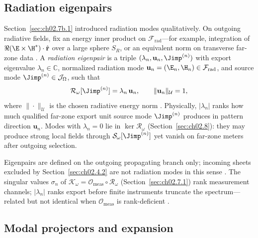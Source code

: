 
\subsection{Radiation eigenpairs}
\label{sec:ch02.7b.6}

Section~\ref{sec:ch02.7b.1} introduced radiation modes qualitatively. On outgoing radiative fields, fix an energy inner product on $\mathcal{F}_{\mathrm{rad}}$---for example, integration of $\Re(\E\times\H^*)\cdot\hat{\mathbf{r}}$ over a large sphere $S_R$, or an equivalent norm on transverse far-zone data \cite{stratton1941,harrington2001}. A \emph{radiation eigenpair} is a triple $(\lambda_n,\mathbf{u}_n,\Jimp^{(n)})$ with export eigenvalue $\lambda_n\in\mathbb{C}$, normalized radiation mode $\mathbf{u}_n=(\E_n,\H_n)\in\mathcal{F}_{\mathrm{rad}}$, and source mode $\Jimp^{(n)}\in\mathcal{J}_\Omega$, such that
\begin{equation}
\label{eq:ch2.radiation-eigenpair-def}
\mathcal{R}_\omega[\Jimp^{(n)}]=\lambda_n\,\mathbf{u}_n,
\qquad
\|\mathbf{u}_n\|_{\mathcal{U}}=1,
\end{equation}
where $\|\cdot\|_{\mathcal{U}}$ is the chosen radiative energy norm \cite{stratton1941}. Physically, $|\lambda_n|$ ranks how much qualified far-zone export unit source mode $\Jimp^{(n)}$ produces in pattern direction $\mathbf{u}_n$. Modes with $\lambda_n=0$ lie in $\ker\mathcal{R}_\omega$ (Section~\ref{sec:ch02.8}): they may produce strong local fields through $\mathcal{S}_\omega[\Jimp^{(n)}]$ yet vanish on far-zone meters after outgoing selection.

Eigenpairs are defined on the outgoing propagating branch only; incoming sheets excluded by Section~\ref{sec:ch02.4.2} are not radiation modes in this sense \cite{stratton1941}. The singular values $\sigma_n$ of $\mathcal{K}_\omega=\mathcal{O}_{\mathrm{meas}}\circ\mathcal{R}_\omega$ (Section~\ref{sec:ch02.7.1}) rank measurement channels; $|\lambda_n|$ ranks export before finite instruments truncate the spectrum---related but not identical when $\mathcal{O}_{\mathrm{meas}}$ is rank-deficient \cite{hansen1988,devaney2004}.

\subsection{Modal projectors and expansion}
\label{sec:ch02.7b.7}

